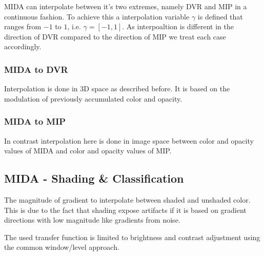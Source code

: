 MIDA can interpolate between it's two extremes, namely DVR and MIP in a continuous fashion.
To achieve this a interpolation variable $\gamma$ is defined that ranges from $-1$ to $1$, i.e. $\gamma=[-1,1]$.
As interpoaltion is different in the direction of DVR compared to the direction of MIP we treat each case accordingly. 

\subsubsection{MIDA to DVR}

Interpolation is done in 3D space as described before. It is based on the modulation of previously accumulated color and 
opacity.


\subsubsection{MIDA to MIP}

In contrast interpolation here is done in image space between color and opacity values of MIDA and 
color and opacity values of MIP. 


\subsection{MIDA - Shading \& Classification}

The magnitude of gradient to interpolate between shaded and unshaded color. This is due to the fact that shading expose artifacts if it is based on gradient directions with low magnitude like gradients from noise.

The used transfer function is limited to brightness and contrast adjustment using the common window/level approach.


